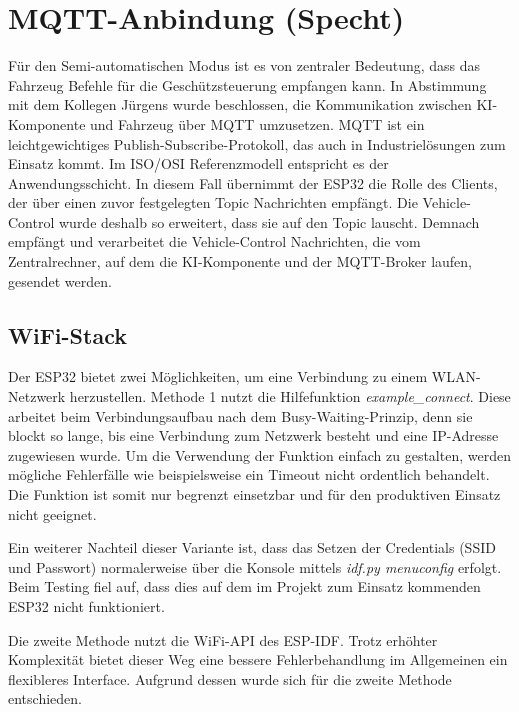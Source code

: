 \section{MQTT-Anbindung (Specht)}

Für den Semi-automatischen Modus ist es von zentraler Bedeutung, dass das Fahrzeug Befehle für die Geschützsteuerung empfangen kann. In Abstimmung mit dem Kollegen Jürgens wurde beschlossen, die Kommunikation zwischen KI-Komponente und Fahrzeug über MQTT umzusetzen. MQTT ist ein leichtgewichtiges Publish-Subscribe-Protokoll, das auch in Industrielösungen zum Einsatz kommt. Im ISO/OSI Referenzmodell entspricht es der Anwendungsschicht. In diesem Fall übernimmt der ESP32 die Rolle des Clients, der über einen zuvor festgelegten Topic Nachrichten empfängt. Die Vehicle-Control wurde deshalb so erweitert, dass sie auf den Topic lauscht. Demnach empfängt und verarbeitet die Vehicle-Control Nachrichten, die vom Zentralrechner, auf dem die KI-Komponente und der MQTT-Broker laufen, gesendet werden. \newline

\subsection{WiFi-Stack}

Der ESP32 bietet zwei Möglichkeiten, um eine Verbindung zu einem WLAN-Netzwerk herzustellen. Methode 1 nutzt die Hilfefunktion \textit{example_connect}. Diese arbeitet beim Verbindungsaufbau nach dem Busy-Waiting-Prinzip, denn sie blockt so lange, bis eine Verbindung zum Netzwerk besteht und eine IP-Adresse zugewiesen wurde. Um die Verwendung der Funktion einfach zu gestalten, werden mögliche Fehlerfälle wie beispielsweise ein Timeout nicht ordentlich behandelt. Die Funktion ist somit nur begrenzt einsetzbar und für den produktiven Einsatz nicht geeignet. \newline

Ein weiterer Nachteil dieser Variante ist, dass das Setzen der Credentials (SSID und Passwort) normalerweise über die Konsole mittels \textit{idf.py menuconfig} erfolgt. Beim Testing fiel auf, dass dies auf dem im Projekt zum Einsatz kommenden ESP32 nicht funktioniert. \newline

Die zweite Methode nutzt die WiFi-API des ESP-IDF. Trotz erhöhter Komplexität bietet dieser Weg eine bessere Fehlerbehandlung im Allgemeinen ein flexibleres Interface. Aufgrund dessen wurde sich für die zweite Methode entschieden. \newline

